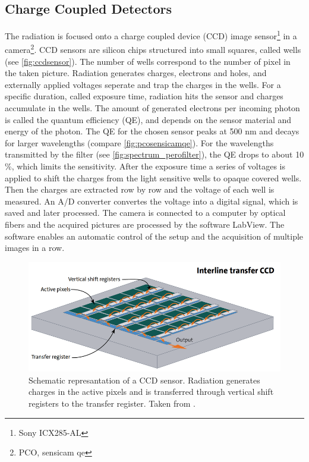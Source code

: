 \subsection{Charge Coupled Detectors}
The radiation is focused onto a charge coupled device (CCD) image sensor\footnote{Sony ICX285-AL} in a camera\footnote{PCO, sensicam qe}. CCD sensors are silicon chips structured into small squares, called wells \cite{SchnellCCD1993}(see \autoref{fig:ccdsensor}). The number of wells correspond to the number of pixel in the taken picture. Radiation generates charges, electrons and holes, and externally applied voltages seperate and trap the charges in the wells. For a specific duration, called exposure time, radiation hits the sensor and charges accumulate in the wells. The amount of generated electrons per incoming photon is called the quantum efficiency (QE), and depends on the sensor material and energy of the photon. The QE for the chosen sensor peaks at 500 nm and decays for larger wavelengths (compare \autoref{fig:pcosensicamqe}). For the wavelengths transmitted by the filter (see \autoref{fig:spectrum_perofilter}), the QE drops to about 10 \%, which limits the sensitivity. After the exposure time a series of voltages is applied to shift the charges from the light sensitive wells to opaque covered wells. Then the charges are extracted row by row and the voltage of each well is measured. An A/D converter convertes the voltage into a digital signal, which is saved and later processed. The camera is connected to a computer by optical fibers and the acquired pictures are processed by the software LabView. The software enables an automatic control of the setup and the acquisition of multiple images in a row.
\begin{figure}
	\centering
	\includegraphics[width=\linewidth]{Images/ExperimentalSetup/ccd-sensor-interline-transfer-en}
	\caption{Schematic represantation of a CCD sensor. Radiation generates charges in the active pixels and is transferred through vertical shift registers to the transfer register. Taken from \cite{StemmerCCD}.}
	\label{fig:ccdsensor}
\end{figure}

